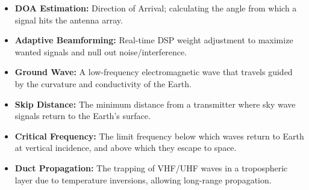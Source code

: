 \documentclass[12pt,a4paper]{article}
\begin{document}
\begin{tcolorbox}[defbox, title={\textbf{One-Line Definitions}}]
\begin{itemize}[leftmargin=*, itemsep=2pt, topsep=0pt]
  \item \textbf{DOA Estimation:} Direction of Arrival; calculating the angle from which a signal hits the antenna array.
  \item \textbf{Adaptive Beamforming:} Real-time DSP weight adjustment to maximize wanted signals and null out noise/interference.
  \item \textbf{Ground Wave:} A low-frequency electromagnetic wave that travels guided by the curvature and conductivity of the Earth.
  \item \textbf{Skip Distance:} The minimum distance from a transmitter where sky wave signals return to the Earth's surface.
  \item \textbf{Critical Frequency:} The limit frequency below which waves return to Earth at vertical incidence, and above which they escape to space.
  \item \textbf{Duct Propagation:} The trapping of VHF/UHF waves in a tropospheric layer due to temperature inversions, allowing long-range propagation.
\end{itemize}
\end{tcolorbox}
\end{document}
